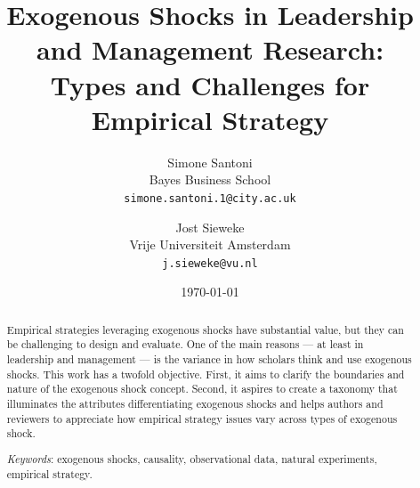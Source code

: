 \documentclass[11pt]{article}
\title{Exogenous Shocks in Leadership and Management Research:\\ 
Types and Challenges for Empirical Strategy\vspace{2em}}
\author{
  Simone Santoni\\
  Bayes Business School\\ 
  \texttt{simone.santoni.1@city.ac.uk}
  \and
  Jost Sieweke\\
  Vrije Universiteit Amsterdam\\
  \texttt{j.sieweke@vu.nl}
}
\date{
  \vspace{1em} \normalsize \today \vspace{1em} \\ 
  }
\begin{document}
\begin{singlespace}

\maketitle

\begin{abstract}
  Empirical strategies leveraging exogenous shocks have substantial value, but
  they can be challenging to design and evaluate. One of the main reasons — at
  least in leadership and management — is the variance in how scholars think and
  use exogenous shocks. This work has a twofold objective. First, it aims to
  clarify the boundaries and nature of the exogenous shock concept. Second, it
  aspires to create a taxonomy that illuminates the attributes differentiating
  exogenous shocks and helps authors and reviewers to appreciate how empirical
  strategy issues vary across types of exogenous shock.
  \bigskip
  
  \textit{Keywords}: exogenous shocks, causality, observational data, 
  natural experiments, empirical strategy.

\end{abstract}

\end{singlespace}

\clearpage
\end{document}
